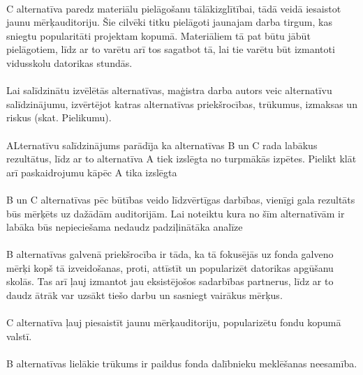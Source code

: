 \paragraph{}
C alternatīva paredz materiālu pielāgošanu tālākizglītībai, tādā veidā iesaistot jaunu mērķauditoriju. Šie
cilvēki titku pielāgoti jaunajam darba tirgum, kas sniegtu popularitāti projektam kopumā. Materiāliem tā pat
būtu jābūt pielāgotiem, līdz ar to varētu arī tos sagatbot tā, lai tie varētu būt izmantoti vidusskolu datorikas
stundās.
\paragraph{}
Lai salīdzinātu izvēlētās alternatīvas, maģistra darba autors veic alternatīvu salīdzinājumu,
izvērtējot katras alternatīvas priekšrocības, trūkumus, izmaksas un riskus (skat. Pielikumu).
\paragraph{} 
ALternatīvu salīdzinājums parādīja ka alternatīvas B un C rada labākus rezultātus, līdz ar to alternatīva A tiek
izslēgta no turpmākās izpētes.
Pielikt klāt arī paskaidrojumu kāpēc A tika izslēgta
\paragraph{}
B un C alternatīvas pēc būtības veido līdzvērtīgas darbības, vienīgi gala rezultāts būs mērķēts uz dažādām
auditorijām. Lai noteiktu kura no šīm alternatīvām ir labāka būs nepieciešama nedaudz padziļinātāka analīze
\paragraph{}
B alternatīvas galvenā priekšrocība ir tāda, ka tā fokusējās uz fonda galveno mērķi kopš tā izveidošanas, proti,
attīstīt un popularizēt datorikas apgūšanu skolās. Tas arī ļauj izmantot jau eksistējošos sadarbības partnerus,
līdz ar to daudz ātrāk var uzsākt tiešo darbu un sasniegt vairākus mērķus.
\paragraph{}
C alternatīva ļauj piesaistīt jaunu mērķauditoriju, popularizētu fondu kopumā valstī.
\paragraph{}
B alternatīvas lielākie trūkums ir paildus fonda dalībnieku meklēšanas neesamība.
